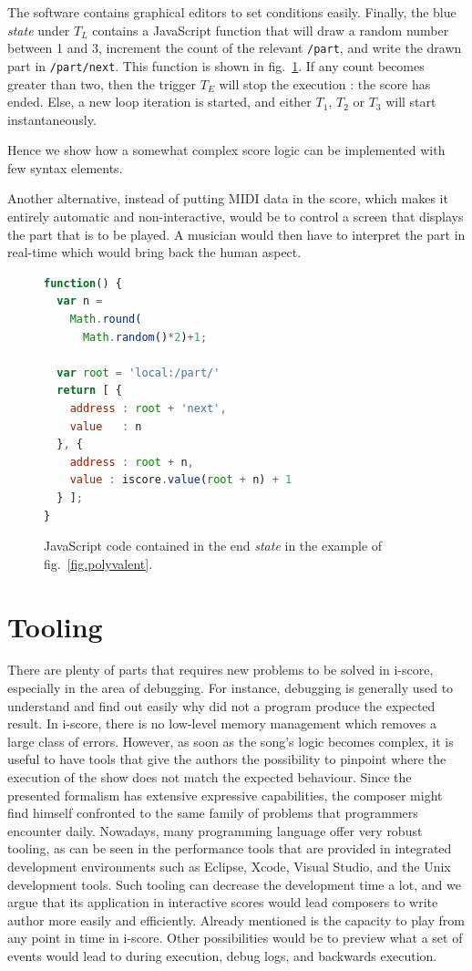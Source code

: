 \documentclass{article}
\newcommand{\state}{\textit{state}\xspace}
\begin{document}
The software contains graphical editors to set conditions easily.
Finally, the blue \state under $T_{L}$ contains a JavaScript function 
that will draw a random number between 1 and 3, 
increment the count of the relevant \verb|/part|, 
and write the drawn part in \verb|/part/next|. 
This function is shown in fig.~\ref{fig.jsmusic}.
If any count becomes greater than two, then the
trigger $T_{E}$ will stop the execution : the score has ended. 
Else, a new loop iteration is started, and either 
$T_1$, $T_2$ or $T_3$ will start instantaneously.

Hence we show how a somewhat complex score logic 
can be implemented with few syntax elements.

Another alternative, instead of putting MIDI data in the score,
which makes it entirely automatic and non-interactive,  
would be to control a screen that displays the part that is 
to be played.
A musician would then have to interpret the part 
in real-time which would bring back the human aspect.
\begin{figure}[h]
\flushleft
\begin{lstlisting}[language=JavaScript,basicstyle=\footnotesize\ttfamily]
function() {      
  var n = 
    Math.round(
      Math.random()*2)+1;
	
  var root = 'local:/part/'
  return [ {
    address : root + 'next',
    value   : n 
  }, {
    address : root + n,
    value : iscore.value(root + n) + 1
  } ];
}
\end{lstlisting}
	\caption{JavaScript code contained in the end \state in the example of fig.~\ref{fig.polyvalent}.}
	\label{fig.jsmusic}
\end{figure}
	
\section{Tooling}
There are plenty of parts that requires new problems to be solved in i-score, especially in the area of debugging. 
For instance, debugging is generally used to understand and find out easily why did not a program produce the expected result.
In i-score, there is no low-level memory management which removes a large class of errors.
However, as soon as the song's logic becomes complex, it is useful to have tools that give the authors the possibility to pinpoint where the execution of the show does not match the expected behaviour.
Since the presented formalism has extensive expressive capabilities, the composer might find himself confronted to the same family of problems that programmers encounter daily.
Nowadays, many programming language offer very robust tooling, as can be seen in the performance tools that are provided in integrated development environments such as Eclipse, Xcode, Visual Studio, and the Unix development tools\cite{spinellis2014software}.
Such tooling can decrease the development time a lot, and we argue that its application in interactive scores would lead composers to write author more easily and efficiently.
Already mentioned is the capacity to play from any point in time in i-score. 
Other possibilities would be to preview what a set of events would lead to during execution, debug logs, and backwards execution. 
\end{document}
